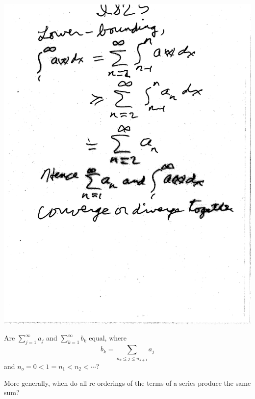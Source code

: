 \documentclass[10pt,a4paper]{article}
\begin{document}
{{\includegraphics[scale=.5]{Pages/IS_25}

\newpage

\noindent Are $\sum_{j=1}^{\infty} a_j$ and $ \sum_{k=1}^{\infty} b_k$ equal, where 
\\$$b_k = \sum_{n_k \leq j \leq n_{k+1}} a_j$$
and $n_o = 0 < 1 = n_1 < n_2 < \cdots $? 
\\ \vspace{2mm}

\noindent More generally, when do all re-orderings of the terms of a series produce the same sum?

}}
\end{document}
